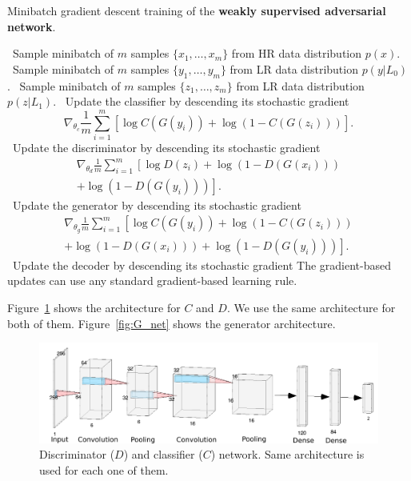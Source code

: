 \documentclass[10pt,twocolumn,letterpaper]{article}
\newcommand{\stateb}{\STATE \textbullet~}
\begin{document}
\begin{algorithm}[h]
    \caption{Minibatch gradient descent training of the \textbf{weakly supervised adversarial network}.}
    \label{alg:srcgan}
    \begin{algorithmic}
    \stateb Sample minibatch of $m$ samples $\{x_1,\ldots, x_m\}$ from HR data distribution $p(x)$.
    \stateb Sample minibatch of $m$ samples $\{y_1,\ldots, y_m\}$ from LR data distribution $p(y|L_0)$.
    \stateb Sample minibatch of $m$ samples $\{z_1,\ldots, z_m\}$ from LR data distribution $p(z|L_1)$.
    \stateb Update the classifier by descending its stochastic gradient
    \[\nabla_{\theta_c} \frac{1}{m} \sum_{i=1}^m \left[\log C(G(y_i)) + \log(1 - C(G(z_i))) \right]. \]
    \stateb Update the discriminator by descending its stochastic gradient
    \[
    \begin{aligned}
    \nabla_{\theta_d} \frac{1}{m} \sum_{i=1}^m \left[\log D(z_i) + \log(1- D(G(x_i))) \right. \\ \left. + \log(1- D(G(y_i))) \right].
    \end{aligned}
    \]
    \stateb Update the generator by descending its stochastic gradient
    \[
    \begin{aligned}
    \nabla_{\theta_{g}} \frac{1}{m} \sum_{i=1}^m \left[\log C(G(y_i)) + \log(1 - C(G(z_i))) \right. \\ \left. + \log(1- D(G(x_i)))+\log(1- D(G(y_i))) \right].
    \end{aligned}
    \]
\stateb Update the decoder by descending its stochastic gradient
    \ENDFOR
    \STATE The gradient-based updates can use any standard gradient-based learning rule.
    \end{algorithmic}
\end{algorithm}


Figure~\ref{fig:D_net} shows the architecture for $C$ and $D.$ We use the same architecture for both of them. Figure~\ref{fig:G_net} shows the generator architecture.

\begin{figure}[h]
\begin{center}
\includegraphics[scale=0.35]{D_net.png}
\end{center}
   \caption{Discriminator ($D$) and classifier ($C$) network. Same architecture is used for each one of them.}
\label{fig:D_net}
\end{figure}
\end{document}
